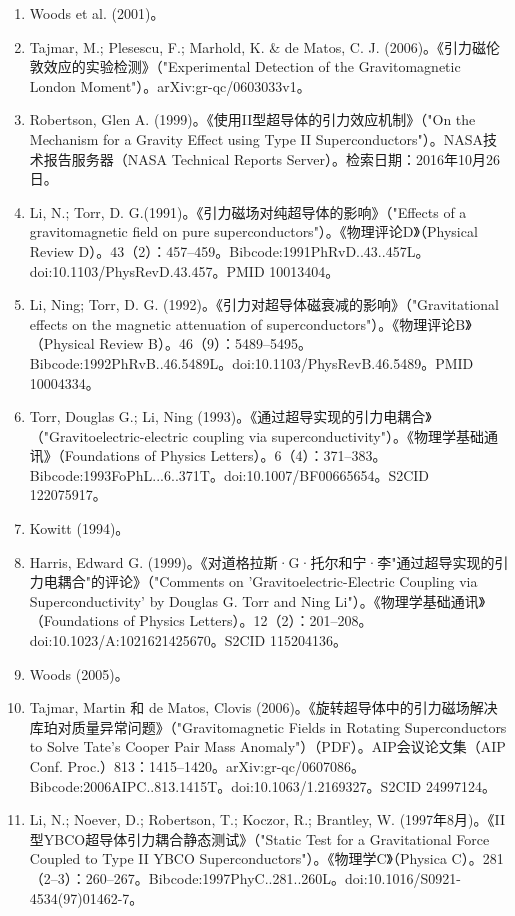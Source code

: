 \begin{enumerate}
\item Woods et al. (2001)。
\item Tajmar, M.; Plesescu, F.; Marhold, K. & de Matos, C. J. (2006)。《引力磁伦敦效应的实验检测》（"Experimental Detection of the Gravitomagnetic London Moment"）。arXiv:gr-qc/0603033v1。
\item Robertson, Glen A. (1999)。《使用II型超导体的引力效应机制》（"On the Mechanism for a Gravity Effect using Type II Superconductors"）。NASA技术报告服务器（NASA Technical Reports Server）。检索日期：2016年10月26日。
\item Li, N.; Torr, D. G.(1991)。《引力磁场对纯超导体的影响》（"Effects of a gravitomagnetic field on pure superconductors"）。《物理评论D》（Physical Review D）。43（2）：457–459。Bibcode:1991PhRvD..43..457L。doi:10.1103/PhysRevD.43.457。PMID 10013404。
\item Li, Ning; Torr, D. G. (1992)。《引力对超导体磁衰减的影响》（"Gravitational effects on the magnetic attenuation of superconductors"）。《物理评论B》（Physical Review B）。46（9）：5489–5495。Bibcode:1992PhRvB..46.5489L。doi:10.1103/PhysRevB.46.5489。PMID 10004334。
\item Torr, Douglas G.; Li, Ning (1993)。《通过超导实现的引力电耦合》（"Gravitoelectric-electric coupling via superconductivity"）。《物理学基础通讯》（Foundations of Physics Letters）。6（4）：371–383。Bibcode:1993FoPhL...6..371T。doi:10.1007/BF00665654。S2CID 122075917。
\item Kowitt (1994)。
\item Harris, Edward G. (1999)。《对道格拉斯·G·托尔和宁·李"通过超导实现的引力电耦合"的评论》（"Comments on 'Gravitoelectric-Electric Coupling via Superconductivity' by Douglas G. Torr and Ning Li"）。《物理学基础通讯》（Foundations of Physics Letters）。12（2）：201–208。doi:10.1023/A:1021621425670。S2CID 115204136。
\item Woods (2005)。
\item Tajmar, Martin 和 de Matos, Clovis (2006)。《旋转超导体中的引力磁场解决库珀对质量异常问题》（"Gravitomagnetic Fields in Rotating Superconductors to Solve Tate's Cooper Pair Mass Anomaly"）（PDF）。AIP会议论文集（AIP Conf. Proc.）813：1415–1420。arXiv:gr-qc/0607086。Bibcode:2006AIPC..813.1415T。doi:10.1063/1.2169327。S2CID 24997124。
\item Li, N.; Noever, D.; Robertson, T.; Koczor, R.; Brantley, W. (1997年8月)。《II型YBCO超导体引力耦合静态测试》（"Static Test for a Gravitational Force Coupled to Type II YBCO Superconductors"）。《物理学C》（Physica C）。281（2–3）：260–267。Bibcode:1997PhyC..281..260L。doi:10.1016/S0921-4534(97)01462-7。

\end{enumerate}
